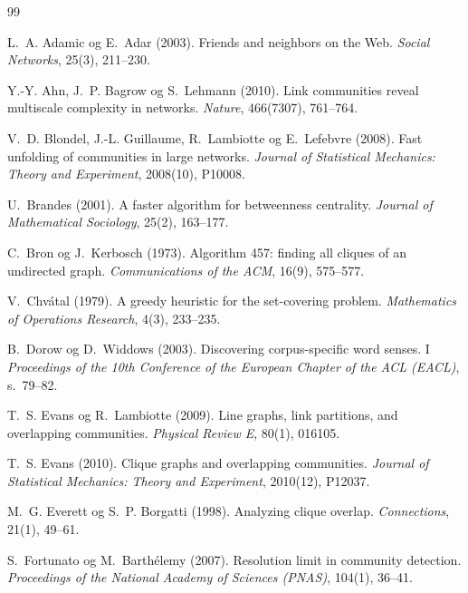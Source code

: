 \documentclass[11pt,a4paper]{article}
\begin{document}
\begin{thebibliography}{99}

L.~A. Adamic og E.~Adar (2003).
\newblock Friends and neighbors on the Web.
\newblock \emph{Social Networks}, 25(3), 211--230.

Y.-Y. Ahn, J.~P. Bagrow og S.~Lehmann (2010).
\newblock Link communities reveal multiscale complexity in networks.
\newblock \emph{Nature}, 466(7307), 761--764.

V.~D. Blondel, J.-L. Guillaume, R.~Lambiotte og E.~Lefebvre (2008).
\newblock Fast unfolding of communities in large networks.
\newblock \emph{Journal of Statistical Mechanics: Theory and Experiment}, 2008(10), P10008.

U.~Brandes (2001).
\newblock A faster algorithm for betweenness centrality.
\newblock \emph{Journal of Mathematical Sociology}, 25(2), 163--177.

C.~Bron og J.~Kerbosch (1973).
\newblock Algorithm 457: finding all cliques of an undirected graph.
\newblock \emph{Communications of the ACM}, 16(9), 575--577.

V.~Chv{\'a}tal (1979).
\newblock A greedy heuristic for the set-covering problem.
\newblock \emph{Mathematics of Operations Research}, 4(3), 233--235.

B.~Dorow og D.~Widdows (2003).
\newblock Discovering corpus-specific word senses.
\newblock I \emph{Proceedings of the 10th Conference of the European Chapter of the ACL (EACL)}, s.~79--82.

T.~S. Evans og R.~Lambiotte (2009).
\newblock Line graphs, link partitions, and overlapping communities.
\newblock \emph{Physical Review E}, 80(1), 016105.

T.~S. Evans (2010).
\newblock Clique graphs and overlapping communities.
\newblock \emph{Journal of Statistical Mechanics: Theory and Experiment}, 2010(12), P12037.

M.~G. Everett og S.~P. Borgatti (1998).
\newblock Analyzing clique overlap.
\newblock \emph{Connections}, 21(1), 49--61.

S.~Fortunato og M.~Barth{\'e}lemy (2007).
\newblock Resolution limit in community detection.
\newblock \emph{Proceedings of the National Academy of Sciences (PNAS)}, 104(1), 36--41.


\end{thebibliography}
\end{document}
